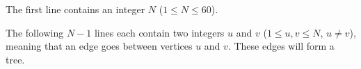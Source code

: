 
The first line contains an integer $N$ ($1 \leq N \leq 60$).

The following $N-1$ lines each contain two integers $u$ and $v$ ($1 \leq u, v \leq N$, $u \neq v$),
meaning that an edge goes between vertices $u$ and $v$. These edges will form a tree.


